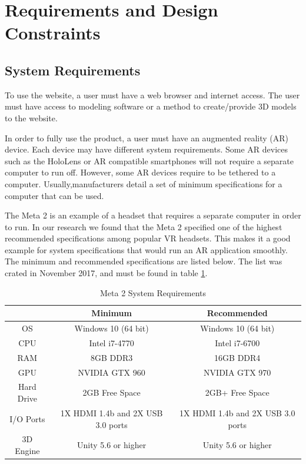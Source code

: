 
\section{Requirements and Design Constraints}


\subsection{System Requirements}

To use the website, a user must have a web browser and internet access.  The user must have access to modeling software or a method to create/provide 3D models to the website.

In order to fully use the product, a user must have an augmented reality (AR) device. Each device may have different system requirements. Some AR devices such as the HoloLens or AR compatible smartphones will not require a separate computer to run off. However, some AR devices require to be tethered to a computer. Usually,manufacturers detail a set of minimum specifications for a computer that can be used.

The Meta 2 is an example of a headset that requires a separate computer in order
to run.  In our research we found that the Meta 2 specified one of the highest 
recommended specifications among popular VR headsets. This makes it a good 
example for system specifications that would run an AR application smoothly. 
The minimum and recommended specifications are listed below. The list was crated
in November 2017, and must be found in table 
\ref{table:metatwosystemrequirements}.

\begin{table}[H]
	\centering
	\begin{tabular}{ | c | c | c | }
		\hline
		& Minimum & Recommended \\ \hline
		OS & Windows 10 (64 bit) & 	Windows 10 (64 bit) \\ \hline
		CPU & Intel i7-4770 & Intel i7-6700 \\ \hline
		RAM & 8GB DDR3 & 16GB DDR4 \\ \hline
		GPU & NVIDIA GTX 960 & NVIDIA GTX 970 \\ \hline
		Hard Drive & 2GB Free Space & 2GB+ Free Space \\ \hline
		I/O Ports & 1X HDMI 1.4b and 2X USB 3.0 ports & 1X HDMI 1.4b and 2X USB 3.0 ports \\ \hline
		3D Engine & Unity 5.6 or higher & Unity 5.6 or higher \\ \hline
	\end{tabular}

	\caption{Meta 2 System Requirements}
	\label{table:metatwosystemrequirements}
\end{table}

